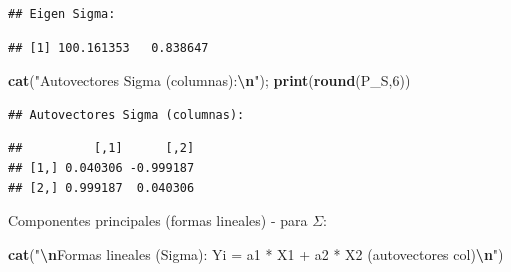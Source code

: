 \documentclass[
]{book}
\newenvironment{Shaded}{\begin{snugshade}}{\end{snugshade}}
\newcommand{\DecValTok}[1]{\textcolor[rgb]{0.00,0.00,0.81}{#1}}
\newcommand{\FunctionTok}[1]{\textcolor[rgb]{0.13,0.29,0.53}{\textbf{#1}}}
\newcommand{\NormalTok}[1]{#1}
\newcommand{\OtherTok}[1]{\textcolor[rgb]{0.56,0.35,0.01}{#1}}
\newcommand{\SpecialCharTok}[1]{\textcolor[rgb]{0.81,0.36,0.00}{\textbf{#1}}}
\newcommand{\StringTok}[1]{\textcolor[rgb]{0.31,0.60,0.02}{#1}}
\begin{document}
\begin{Shaded}
\end{Shaded}

\begin{verbatim}
## Eigen Sigma:
\end{verbatim}

\begin{verbatim}
## [1] 100.161353   0.838647
\end{verbatim}

\begin{Shaded}
\begin{Highlighting}[]
\FunctionTok{cat}\NormalTok{(}\StringTok{"Autovectores Sigma (columnas):}\SpecialCharTok{\textbackslash{}n}\StringTok{"}\NormalTok{); }\FunctionTok{print}\NormalTok{(}\FunctionTok{round}\NormalTok{(P\_S,}\DecValTok{6}\NormalTok{))}
\end{Highlighting}
\end{Shaded}

\begin{verbatim}
## Autovectores Sigma (columnas):
\end{verbatim}

\begin{verbatim}
##          [,1]      [,2]
## [1,] 0.040306 -0.999187
## [2,] 0.999187  0.040306
\end{verbatim}

Componentes principales (formas lineales) - para \(\Sigma\):

\begin{Shaded}
\begin{Highlighting}[]
\FunctionTok{cat}\NormalTok{(}\StringTok{"}\SpecialCharTok{\textbackslash{}n}\StringTok{Formas lineales (Sigma): Yi = a1 * X1 + a2 * X2  (autovectores col)}\SpecialCharTok{\textbackslash{}n}\StringTok{"}\NormalTok{)}
\end{Highlighting}
\end{Shaded}
\end{document}
